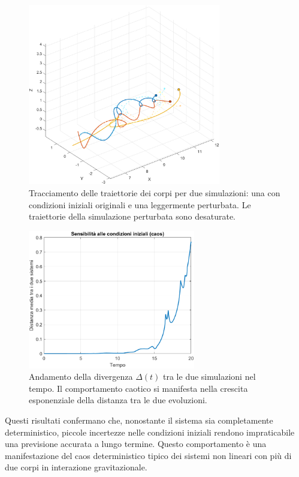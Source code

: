 \documentclass[a4paper,12pt]{article}
\begin{document}
\begin{figure}[h!]
    \centering
    \includegraphics[width=0.75\textwidth]{cahotic_traj.png}
    \caption{Tracciamento delle traiettorie dei corpi per due simulazioni: una con condizioni iniziali originali e una leggermente perturbata. Le traiettorie della simulazione perturbata sono desaturate.}
    \label{fig:traiettorie}
\end{figure}

\begin{figure}[h!]
    \centering
    \includegraphics[width=0.65\textwidth]{cahotic_div.png}
    \caption{Andamento della divergenza \(\Delta(t)\) tra le due simulazioni nel tempo. Il comportamento caotico si manifesta nella crescita esponenziale della distanza tra le due evoluzioni.}
    \label{fig:divergenza}
\end{figure}

Questi risultati confermano che, nonostante il sistema sia completamente deterministico, piccole incertezze nelle condizioni iniziali rendono impraticabile una previsione accurata a lungo termine. Questo comportamento è una manifestazione del caos deterministico tipico dei sistemi non lineari con più di due corpi in interazione gravitazionale.
\end{document}
